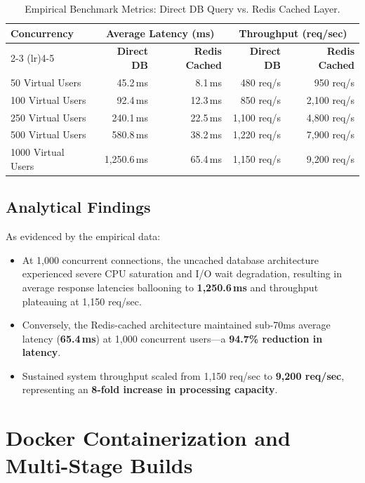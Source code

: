 \begin{table}[htbp]
\centering
\caption{Empirical Benchmark Metrics: Direct DB Query vs. Redis Cached Layer.}
\label{tab:benchmark_metrics}
\begin{tabularx}{\textwidth}{lrrrr}
\toprule
\textbf{Concurrency} & \multicolumn{2}{c}{\textbf{Average Latency (ms)}} & \multicolumn{2}{c}{\textbf{Throughput (req/sec)}} \\
\cmidrule(lr){2-3} \cmidrule(lr){4-5}
& \textbf{Direct DB} & \textbf{Redis Cached} & \textbf{Direct DB} & \textbf{Redis Cached} \\
\midrule
50 Virtual Users   & 45.2\,ms   & 8.1\,ms   & 480 req/s   & 950 req/s   \\
100 Virtual Users  & 92.4\,ms   & 12.3\,ms  & 850 req/s   & 2,100 req/s \\
250 Virtual Users  & 240.1\,ms  & 22.5\,ms  & 1,100 req/s & 4,800 req/s \\
500 Virtual Users  & 580.8\,ms  & 38.2\,ms  & 1,220 req/s & 7,900 req/s \\
1000 Virtual Users & 1,250.6\,ms & 65.4\,ms & 1,150 req/s & 9,200 req/s \\
\bottomrule
\end{tabularx}
\end{table}

\subsection{Analytical Findings}
As evidenced by the empirical data:
\begin{itemize}
    \item At 1,000 concurrent connections, the uncached database architecture experienced severe CPU saturation and I/O wait degradation, resulting in average response latencies ballooning to \textbf{1,250.6\,ms} and throughput plateauing at 1,150 req/sec.
    \item Conversely, the Redis-cached architecture maintained sub-70ms average latency (\textbf{65.4\,ms}) at 1,000 concurrent users—a \textbf{94.7\% reduction in latency}.
    \item Sustained system throughput scaled from 1,150 req/sec to \textbf{9,200 req/sec}, representing an \textbf{8-fold increase in processing capacity}.
\end{itemize}

\section{Docker Containerization and Multi-Stage Builds}
\label{sec:test_docker}

